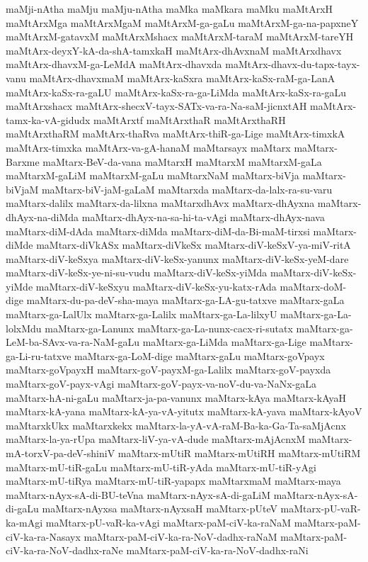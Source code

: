 {maMji-nAtha
maMju
maMju-nAtha
maMka
maMkara
maMku
maMtArxH
maMtArxMga
maMtArxMgaM
maMtArxM-ga-gaLu
maMtArxM-ga-na-papxneY
maMtArxM-gatavxM
maMtArxMshacx
maMtArxM-taraM
maMtArxM-tareYH
maMtArx-deyxY-kA-da-shA-tamxkaH
maMtArx-dhAvxnaM
maMtArxdhavx
maMtArx-dhavxM-ga-LeMdA
maMtArx-dhavxda
maMtArx-dhavx-du-tapx-tayx-vanu
maMtArx-dhavxmaM
maMtArx-kaSxra
maMtArx-kaSx-raM-ga-LanA
maMtArx-kaSx-ra-gaLU
maMtArx-kaSx-ra-ga-LiMda
maMtArx-kaSx-ra-gaLu
maMtArxshacx
maMtArx-shecxV-tayx-SATx-va-ra-Na-saM-jicnxtAH
maMtArx-tamx-ka-vA-gidudx
maMtArxtf
maMtArxthaR
maMtArxthaRH
maMtArxthaRM
maMtArx-thaRva
maMtArx-thiR-ga-Lige
maMtArx-timxkA
maMtArx-timxka
maMtArx-va-gA-hanaM
maMtarsayx
maMtarx
maMtarx-Barxme
maMtarx-BeV-da-vana
maMtarxH
maMtarxM
maMtarxM-gaLa
maMtarxM-gaLiM
maMtarxM-gaLu
maMtarxNaM
maMtarx-biVja
maMtarx-biVjaM
maMtarx-biV-jaM-gaLaM
maMtarxda
maMtarx-da-lalx-ra-su-varu
maMtarx-dalilx
maMtarx-da-lilxna
maMtarxdhAvx
maMtarx-dhAyxna
maMtarx-dhAyx-na-diMda
maMtarx-dhAyx-na-sa-hi-ta-vAgi
maMtarx-dhAyx-nava
maMtarx-diM-dAda
maMtarx-diMda
maMtarx-diM-da-Bi-maM-tirxsi
maMtarx-diMde
maMtarx-diVkASx
maMtarx-diVkeSx
maMtarx-diV-keSxV-ya-miV-ritA
maMtarx-diV-keSxya
maMtarx-diV-keSx-yanunx
maMtarx-diV-keSx-yeM-dare
maMtarx-diV-keSx-ye-ni-su-vudu
maMtarx-diV-keSx-yiMda
maMtarx-diV-keSx-yiMde
maMtarx-diV-keSxyu
maMtarx-diV-keSx-yu-katx-rAda
maMtarx-doM-dige
maMtarx-du-pa-deV-sha-maya
maMtarx-ga-LA-gu-tatxve
maMtarx-gaLa
maMtarx-ga-LalUlx
maMtarx-ga-Lalilx
maMtarx-ga-La-lilxyU
maMtarx-ga-La-lolxMdu
maMtarx-ga-Lanunx
maMtarx-ga-La-nunx-cacx-ri-sutatx
maMtarx-ga-LeM-ba-SAvx-va-ra-NaM-gaLu
maMtarx-ga-LiMda
maMtarx-ga-Lige
maMtarx-ga-Li-ru-tatxve
maMtarx-ga-LoM-dige
maMtarx-gaLu
maMtarx-goVpayx
maMtarx-goVpayxH
maMtarx-goV-payxM-ga-Lalilx
maMtarx-goV-payxda
maMtarx-goV-payx-vAgi
maMtarx-goV-payx-va-noV-du-va-NaNx-gaLa
maMtarx-hA-ni-gaLu
maMtarx-ja-pa-vanunx
maMtarx-kAya
maMtarx-kAyaH
maMtarx-kA-yana
maMtarx-kA-ya-vA-yitutx
maMtarx-kA-yava
maMtarx-kAyoV
maMtarxkUkx
maMtarxkekx
maMtarx-la-yA-vA-raM-Ba-ka-Ga-Ta-saMjAcnx
maMtarx-la-ya-rUpa
maMtarx-liV-ya-vA-dude
maMtarx-mAjAcnxM
maMtarx-mA-torxV-pa-deV-shiniV
maMtarx-mUtiR
maMtarx-mUtiRH
maMtarx-mUtiRM
maMtarx-mU-tiR-gaLu
maMtarx-mU-tiR-yAda
maMtarx-mU-tiR-yAgi
maMtarx-mU-tiRya
maMtarx-mU-tiR-yapapx
maMtarxmaM
maMtarx-maya
maMtarx-nAyx-sA-di-BU-teVna
maMtarx-nAyx-sA-di-gaLiM
maMtarx-nAyx-sA-di-gaLu
maMtarx-nAyxsa
maMtarx-nAyxsaH
maMtarx-pUteV
maMtarx-pU-vaR-ka-mAgi
maMtarx-pU-vaR-ka-vAgi
maMtarx-paM-ciV-ka-raNaM
maMtarx-paM-ciV-ka-ra-Nasayx
maMtarx-paM-ciV-ka-ra-NoV-dadhx-raNaM
maMtarx-paM-ciV-ka-ra-NoV-dadhx-raNe
maMtarx-paM-ciV-ka-ra-NoV-dadhx-raNi
}
